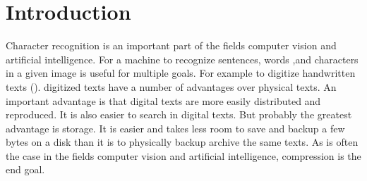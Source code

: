 \section{Introduction} %
\label{sec:introduction}






















Character recognition is an important part of the fields computer vision and artificial intelligence. For a machine to recognize sentences, words ,and characters in a given image is useful for multiple goals. For example to digitize handwritten texts (\cite{Jaeger2003}). digitized texts have a number of advantages over physical texts. An important advantage is that digital texts are more easily distributed and reproduced. It is also easier to search in digital texts. But probably the greatest advantage is storage. It is easier and takes less room to save and backup a few bytes on a disk than it is to physically backup archive the same texts. As is often the case in the fields computer vision and artificial intelligence, compression is the end goal.

